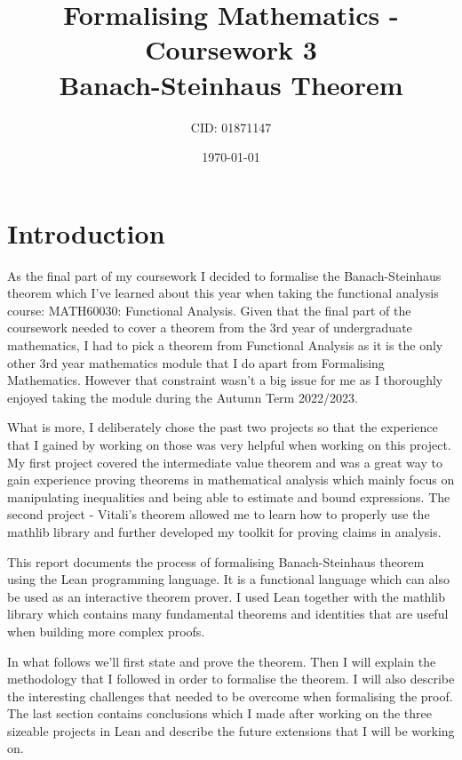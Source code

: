 \documentclass[11pt]{article}
\begin{document}
\title{Formalising Mathematics - Coursework 3 \\ Banach-Steinhaus Theorem}
\date{\today}
\author{CID: 01871147}
\maketitle

\section*{Introduction}

As the final part of my coursework I decided to formalise the Banach-Steinhaus theorem
which I've learned about this year when taking the functional analysis course:
MATH60030: Functional Analysis. Given that the final part of the coursework needed
to cover a theorem from the 3rd year of undergraduate mathematics, I had to pick
a theorem from Functional Analysis as it is the only other 3rd year mathematics
module that I do apart from Formalising Mathematics. However that constraint wasn't
a big issue for me as I thoroughly enjoyed taking the module during the Autumn Term
2022/2023.

What is more, I deliberately chose the past two projects so that the experience
that I gained by working on those was very helpful when working on this project.
My first project covered the intermediate value theorem and was a great way to
gain experience proving theorems in mathematical analysis which mainly focus on
manipulating inequalities and being able to estimate and bound expressions. The
second project - Vitali's theorem allowed me to learn how to properly use the mathlib
library and further developed my toolkit for proving claims in analysis.

This report documents the process of formalising Banach-Steinhaus theorem using the Lean programming language.
It is a functional language which can also be used as an interactive theorem prover. I used Lean together
with the mathlib library which contains many fundamental theorems and identities that are useful when
building more complex proofs.

In what follows we'll first state and prove the theorem. Then I will explain the
methodology that I followed in order to formalise the theorem. I will also describe
the interesting challenges that needed to be overcome when formalising the proof.
The last section contains conclusions which I made after working on the three sizeable
projects in Lean and describe the future extensions that I will be working on.
\end{document}
